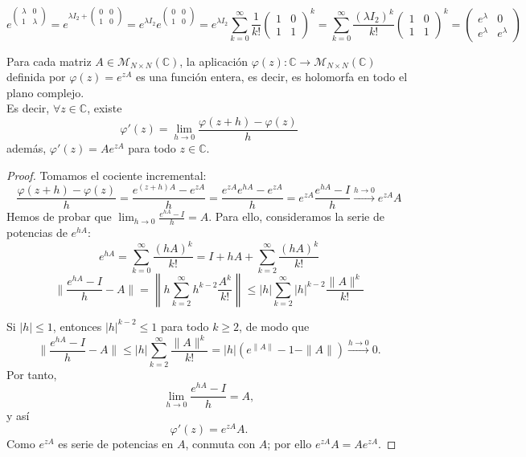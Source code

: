 \[
    e^{\begin{pmatrix}
        \lambda & 0 \\
        1 & \lambda
    \end{pmatrix}} = e^{\lambda I_2 + \begin{pmatrix}
        0 & 0 \\
        1 & 0
    \end{pmatrix}} = e^{\lambda I_2} e^{\begin{pmatrix}
        0 & 0 \\
        1 & 0
    \end{pmatrix}} = e^{\lambda I_2} \sum_{k=0}^\infty \frac{1}{k!} \begin{pmatrix}
        1 & 0 \\
        1 & 1
    \end{pmatrix}^k = \sum_{k=0}^\infty \frac{(\lambda I_2)^k}{k!} \begin{pmatrix}
        1 & 0 \\
        1 & 1
    \end{pmatrix}^k = \begin{pmatrix}
        e^{\lambda} & 0 \\
        e^{\lambda} & e^{\lambda}
    \end{pmatrix}
\]

\begin{teorema}
    Para cada matriz $A \in \mathcal{M}_{N \times N}(\mathbb{C})$, la aplicación $\varphi(z) : \mathbb{C} \to \mathcal{M}_{N \times N}(\mathbb{C})$ definida por $\varphi(z) = e^{zA}$ es una función entera, es decir, es holomorfa en todo el plano complejo.\\
    Es decir, $\forall z \in \mathbb{C}$, existe
    \[
        \varphi'(z) = \lim_{h \to 0} \frac{\varphi(z+h) - \varphi(z)}{h}
    \]
    además, $\varphi'(z) = A e^{zA}$ para todo $z \in \mathbb{C}$.
\end{teorema}

\begin{proof}
    Tomamos el cociente incremental:
    \[
        \frac{\varphi(z+h) - \varphi(z)}{h} = \frac{e^{(z+h)A} - e^{zA}}{h} = \frac{e^{zA} e^{hA} - e^{zA}}{h} = e^{zA} \frac{e^{hA} - I}{h} \xrightarrow{h \to 0} e^{zA} A
    \]
    Hemos de probar que $\lim_{h \to 0} \frac{e^{hA} - I}{h} = A$. Para ello, consideramos la serie de potencias de $e^{hA}$:
    \[
        e^{hA} = \sum_{k=0}^\infty \frac{(hA)^k}{k!} = I + hA + \sum_{k=2}^\infty \frac{(hA)^k}{k!}
    \]
    \[
        \| \frac{e^{hA} - I}{h} - A \| = \left\| h \sum_{k=2}^{\infty} h^{k-2} \frac{A^k}{k!} \right\| \le |h| \sum_{k=2}^{\infty} |h|^{k-2} \frac{\|A\|^k}{k!}
    \]

    Si $|h| \le 1$, entonces $|h|^{k-2} \le 1$ para todo $k \ge 2$, de modo que
    \[
        \| \frac{e^{hA} - I}{h} - A \| \le |h| \sum_{k=2}^{\infty} \frac{\|A\|^k}{k!} = |h| (e^{\|A\|} - 1 - \|A\|) \xrightarrow{h \to 0} 0.
    \]
    Por tanto,
    \[
        \lim_{h \to 0} \frac{e^{hA} - I}{h} = A,
    \]
    y así
    \[
        \varphi'(z) = e^{zA}A.
    \]
    Como $e^{zA}$ es serie de potencias en $A$, conmuta con $A$; por ello $e^{zA}A = Ae^{zA}$.

\end{proof}

